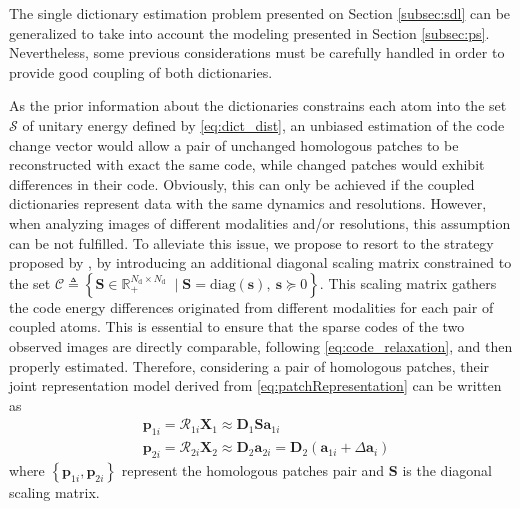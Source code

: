 \documentclass[review]{elsarticle}
\newcommand{\Natom}{N_{\mathrm{d}}}
\begin{document}
The single dictionary estimation problem presented on Section \ref{subsec:sdl} can be generalized to take into account the modeling presented in Section \ref{subsec:ps}. Nevertheless, some previous considerations must be carefully handled in order to provide good coupling of both dictionaries.

As the prior information about the dictionaries constrains each atom into the set $\mathcal{S}$ of unitary energy defined by \eqref{eq:dict_dist}, an unbiased estimation of the code change vector would allow a pair of unchanged homologous patches to be reconstructed  with exact the same code, while changed patches would exhibit differences in their code. Obviously, this can only be achieved if the coupled dictionaries represent data with the same dynamics and resolutions. However, when analyzing images of different modalities and/or resolutions, this assumption can be not fulfilled. To alleviate this issue, we propose to resort to the strategy proposed by \citet{seichepine_soft_2014}, by introducing an additional diagonal scaling matrix constrained to the set $\mathcal{C} \triangleq \left\{\mathbf{S} \in \mathbb{R}^{\Natom \times \Natom}_{+} \; \mid \mathbf{S} = \mathrm{diag}(\mathbf{s}),\ \mathbf{s}\succeq 0 \right\}$. This scaling matrix gathers the code energy differences originated from different modalities for each pair of coupled atoms. This is essential to ensure that the sparse codes of the two observed images are directly comparable, following \eqref{eq:code_relaxation}, and then properly estimated. Therefore, considering a pair of homologous patches, their joint representation model derived from \eqref{eq:patchRepresentation} can be written as
%
\begin{equation}
	\label{eq:coupled_patchRepresentation}
    \begin{aligned}
	&\mathbf{p}_{1{i}} = \mathcal{R}_{1{i}}\mathbf{X}_{1}  \approx \mathbf{D}_{1}\mathbf{S}\mathbf{a}_{1{i}}\\
	&\mathbf{p}_{2{i}} = \mathcal{R}_{2{i}}\mathbf{X}_{2} \approx \mathbf{D}_{2}\mathbf{a}_{2{i}} = \mathbf{D}_{2}\left(\mathbf{a}_{1{i}} + \Delta\mathbf{a}_{i}\right)
	\end{aligned}
\end{equation}
%
where $\left\{\mathbf{p}_{1{i}},\mathbf{p}_{2{i}}\right\}$
represent the homologous patches pair and $\mathbf{S}$ is the diagonal scaling matrix.
\end{document}
